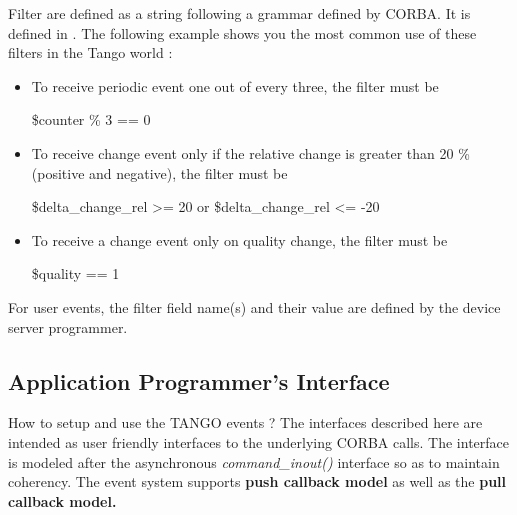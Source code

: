 \vspace{0.3cm}


Filter are defined as a string following a grammar defined by CORBA.
It is defined in \cite{Notif_doc}. The following example shows you
the most common use of these filters in the Tango world :
\begin{itemize}
\item To receive periodic event one out of every three, the filter must
be \begin{center}\textquotedbl{}\$counter \% 3 == 0\textquotedbl{}\end{center}
\item To receive change event only if the relative change is greater than
20 \% (positive and negative), the filter must be \begin{center}\textquotedbl{}\$delta\_change\_rel
>= 20 or \$delta\_change\_rel <= -20\textquotedbl{}\end{center}
\item To receive a change event only on quality change, the filter must
be \begin{center}\textquotedbl{}\$quality == 1\textquotedbl{}\end{center}
\end{itemize}
For user events, the filter field name(s) and their value are defined
by the device server programmer.


\subsection{Application Programmer's Interface}

How to setup and use the TANGO events ? The interfaces described here
are intended as user friendly interfaces to the underlying CORBA calls.
The interface is modeled after the asynchronous
\emph{command\_inout()} interface so as to
maintain coherency. The event system supports \textbf{push callback
model} as well as the \textbf{pull callback model.}

